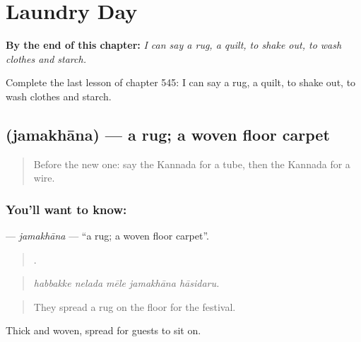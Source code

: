 
\chapter{Laundry Day}
\label{ch:ka-laundry-day}

\begin{chapteropening}
\textbf{By the end of this chapter:} \emph{I can say a rug, a quilt, to shake out, to wash clothes and starch.}

Complete the last lesson of chapter 545: I can say a rug, a quilt, to shake out, to wash clothes and starch.
\end{chapteropening}

\section[\texorpdfstring{\kn{ಜಮಖಾನ} (jamakhāna)}{ಜಮಖಾನ (jamakhāna)}]{ (jamakhāna) — a rug; a woven floor carpet}

\label{lesson:KA-C545-jamakhana}



\begin{quote}
Before the new one: say the Kannada for a tube, then the Kannada for a wire.
\end{quote}

\subsection*{You'll want to know: }
\textbf{} — \emph{jamakhāna} — \textquotedblleft{}a rug; a woven floor carpet\textquotedblright{}.

\begin{quote}
    .
\end{quote}

\begin{quote}
\emph{habbakke nelada mēle jamakhāna hāsidaru.}
\end{quote}

\begin{quote}
They spread a rug on the floor for the festival.
\end{quote}

Thick and woven, spread for guests to sit on.

